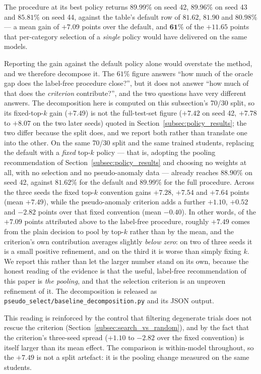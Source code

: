 The procedure at its best policy returns $89.99\%$ on seed 42, $89.96\%$ on seed
43 and $85.81\%$ on seed 44, against the table's default row of $81.62$, $81.90$
and $80.98\%$ --- a mean gain of $\mathbf{+7.09}$ points over the default, and
$\mathbf{61\%}$ of the $+11.65$ points that per-category selection of a \emph{single}
policy would
have delivered on the same models.

Reporting the gain against the default policy alone would overstate the method,
and we therefore decompose it. The $61\%$ figure answers ``how much of the oracle
gap does the label-free procedure close?'', but it does not answer ``how much of
that does the \emph{criterion} contribute?'', and the two questions have very
different answers. The decomposition here is computed on this subsection's 70/30
split, so its fixed-top-$k$ gain ($+7.49$) is not the full-test-set figure
($+7.42$ on seed 42, $+7.78$ to $+8.07$ on the two later seeds) quoted in
Section~\ref{subsec:policy_results}; the two differ because the split does, and we
report both rather than translate one into the other. On the same 70/30 split and
the same trained students, replacing
the default with a \emph{fixed} top-$k$ policy --- that is, adopting the pooling
recommendation of Section~\ref{subsec:policy_results} and choosing no weights at
all, with no selection and no pseudo-anomaly data --- already reaches
$\mathbf{88.90\%}$ on seed 42, against $81.62\%$ for the default and $89.99\%$ for
the full procedure. Across the three seeds the fixed top-$k$ convention gains
$+7.28$, $+7.54$ and $+7.64$ points (mean $\mathbf{+7.49}$), while the
pseudo-anomaly criterion adds a further $+1.10$, $+0.52$ and $\mathbf{-2.82}$
points over that fixed convention (mean $\mathbf{-0.40}$). In other words, of the
$+7.09$ points attributed above to the label-free procedure, roughly $+7.49$ comes
from the plain decision to pool by top-$k$ rather than by the mean, and the
criterion's own contribution averages slightly \emph{below zero}: on two of three
seeds it is a small positive refinement, and on the third it is worse than simply
fixing $k$. We report this rather than let the larger number stand on its own,
because the honest reading of the evidence is that the useful, label-free
recommendation of this paper is \emph{the pooling}, and that the selection
criterion is an unproven refinement of it. The decomposition is released as
\texttt{pseudo\_select/baseline\_decomposition.py} and its JSON output.

This reading is reinforced by the control that filtering degenerate trials does not
rescue the criterion (Section~\ref{subsec:search_vs_random}), and by the fact that
the criterion's three-seed spread ($+1.10$ to $-2.82$ over the fixed convention) is
itself larger than its mean effect. The comparison is
within-model throughout, so the $+7.49$ is not a split artefact: it is the
pooling change measured on the same students.

